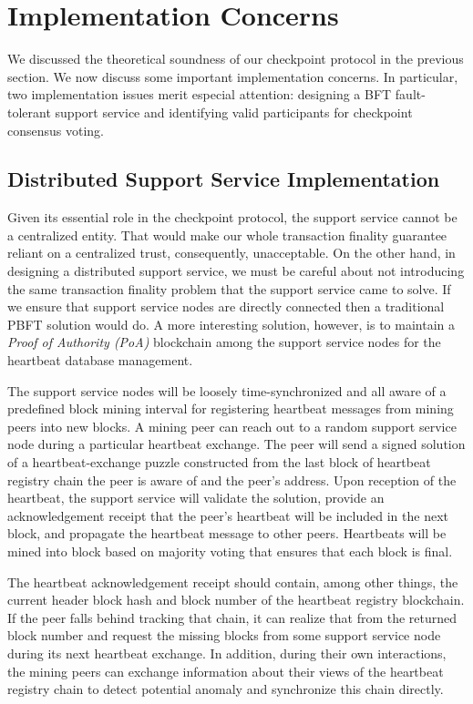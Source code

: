 
\section{Implementation Concerns}
\label{s-implementation}
We discussed the theoretical soundness of our checkpoint protocol in the previous section. We now discuss some important implementation concerns. In particular, two implementation issues merit especial attention: designing a BFT fault-tolerant support service and identifying valid participants for checkpoint consensus voting.       

\subsection{Distributed Support Service Implementation}
Given its essential role in the checkpoint protocol, the support service cannot be a centralized entity. That would make our whole transaction finality guarantee reliant on a centralized trust, consequently, unacceptable. On the other hand, in designing a distributed support service, we must be careful about not introducing the same transaction finality problem that the support service came to solve. If we ensure that support service nodes are directly connected then a traditional PBFT \cite{Castro:1999:PBF:296806.296824} solution would do. A more interesting solution, however, is to maintain a \textit{Proof of Authority (PoA)} blockchain among the support service nodes for the heartbeat database management.           

The support service nodes will be loosely time-synchronized and all aware of a predefined block mining interval for registering heartbeat messages from mining peers into new blocks. A mining peer can reach out to a random support service node during a particular heartbeat exchange. The peer will send a signed solution of a heartbeat-exchange puzzle constructed from the last block of heartbeat registry chain the peer is aware of and the peer's address. Upon reception of the heartbeat, the support service will validate the solution, provide an acknowledgement receipt that the peer's heartbeat will be included in the next block, and propagate the heartbeat message to other peers. Heartbeats will be mined into block based on majority voting that ensures that each block is final. 

The heartbeat acknowledgement receipt should contain, among other things, the current header block hash and block number of the heartbeat registry blockchain. If the peer falls behind tracking that chain, it can realize that from the returned block number and request the missing blocks from some support service node during its next heartbeat exchange. In addition, during their own interactions, the mining peers can exchange information about their views of the heartbeat registry chain to detect potential anomaly and synchronize this chain directly.


